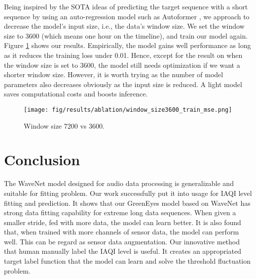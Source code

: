 \documentclass[
twocolumn,
]{ceurart}
\begin{document}
Being inspired by the SOTA ideas of predicting the target sequence with a short sequence by using an auto-regression model such as Autoformer \cite{wu2021autoformer}, we approach to decrease the model's input size, i.e., the data's window size. We set the window size to 3600 (which means one hour on the timeline), and train our model again. Figure \ref{fig:window_size3600_train_mse} shows our results. Empirically, the model gains well performance as long as it reduces the training loss under 0.01. Hence, except for the result on  when the window size is set to 3600, the model still needs optimization if we want a shorter window size. However, it is worth trying as the number of model parameters also decreases obviously as the input size is reduced. A light model saves computational costs and boosts inference.

\begin{figure}[!htbp]
    \centering
    \texttt{[image: fig/results/ablation/window\_size3600\_train\_mse.png]}
    \caption{Window size 7200 vs 3600.}
    \label{fig:window_size3600_train_mse}
\end{figure}


\section{Conclusion}

The WaveNet model designed for audio data processing is generalizable and suitable for fitting problem. Our work successfully put it into usage for IAQI level fitting and prediction. It shows that our GreenEyes model based on WaveNet has strong data fitting capability for extreme long data sequences. When given a smaller stride, fed with more data, the model can learn better. It is also found that, when trained with more channels of sensor data, the model can perform well. This can be regard as sensor data augmentation. Our innovative method that human manually label the IAQI level is useful. It creates an appropriated target label function that the model can learn and solve the threshold fluctuation problem.

\end{document}
